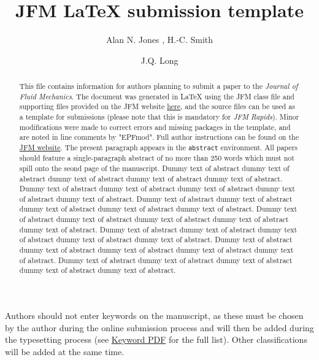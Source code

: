 \documentclass[lineno]{jfm}
\title{JFM {\LaTeX} submission template}
\author{Alan N. Jones\aff{1}
  \corresp{\email{JFMEditorial@cambridge.org}},
  H.-C. Smith\aff{1}
 \and J.Q. Long\aff{2}}
\affiliation{\aff{1}STM Journals, Cambridge University Press, The Printing House, Shaftesbury Road, Cambridge CB2 8BS, UK
\aff{2}DAMTP, Centre for Mathematical Sciences, Wilberforce Road, Cambridge CB3 0WA, UK}
\begin{document}
\maketitle

\begin{abstract}
This file contains information for authors planning to submit a paper to the {\it Journal of Fluid Mechanics}. The document was generated in {\LaTeX} using the JFM class file and supporting files provided on the JFM website \href{https://www.cambridge.org/core/journals/journal-of-fluid-mechanics/information/author-instructions/preparing-your-materials}{here}, and the source files can be used as a template for submissions (please note that this is mandatory for {\it JFM Rapids}). Minor modifications were made to correct errors and missing packages in the template, and are noted in line comments by "EPFmod". Full author instructions can be found on the \href{https://www.cambridge.org/core/journals/journal-of-fluid-mechanics/information/author-instructions}{JFM website}. The present paragraph appears in the \verb}abstract} environment. All papers should feature a single-paragraph abstract of no more than 250 words which must not spill onto the seond page of the manuscript. Dummy text of abstract dummy text of abstract dummy text of abstract dummy text of abstract dummy text of abstract. Dummy text of abstract dummy text of abstract dummy text of abstract dummy text of abstract dummy text of abstract. Dummy text of abstract dummy text of abstract dummy text of abstract dummy text of abstract dummy text of abstract. Dummy text of abstract dummy text of abstract dummy text of abstract dummy text of abstract dummy text of abstract. Dummy text of abstract dummy text of abstract dummy text of abstract dummy text of abstract dummy text of abstract. Dummy text of abstract dummy text of abstract dummy text of abstract dummy text of abstract dummy text of abstract. Dummy text of abstract dummy text of abstract dummy text of abstract dummy text of abstract dummy text of abstract. 
\end{abstract}

\begin{keywords}
Authors should not enter keywords on the manuscript, as these must be chosen by the author during the online submission process and will then be added during the typesetting process (see \href{https://www.cambridge.org/core/journals/journal-of-fluid-mechanics/information/list-of-keywords}{Keyword PDF} for the full list).  Other classifications will be added at the same time.
\end{keywords}
\end{document}
